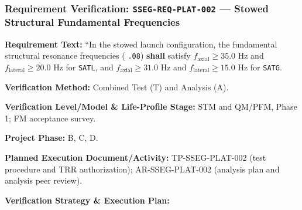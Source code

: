 \subsubsection{Requirement Verification: \texttt{SSEG-REQ-PLAT-002} --- Stowed Structural Fundamental Frequencies}
\label{ver:SSEG-REQ-PLAT-002}
\textbf{Requirement Text:} ``In the stowed launch configuration, the fundamental structural resonance frequencies ( \texttt{.08}) \textbf{shall} satisfy $f_{\text{axial}} \ge 35.0\text{ Hz}$ and $f_{\text{lateral}} \ge 20.0\text{ Hz}$ for \texttt{SATL}, and $f_{\text{axial}} \ge 31.0\text{ Hz}$ and $f_{\text{lateral}} \ge 15.0\text{ Hz}$ for \texttt{SATG}.
\par\textbf{Verification Method:} Combined Test (T) and Analysis (A).
\par\textbf{Verification Level/Model \& Life-Profile Stage:} STM and QM/PFM, Phase 1; FM acceptance survey.
\par\textbf{Project Phase:} B, C, D.
\par\textbf{Planned Execution Document/Activity:} TP-SSEG-PLAT-002 (test procedure and TRR authorization); AR-SSEG-PLAT-002 (analysis plan and analysis peer review).
\par\textbf{Verification Strategy \& Execution Plan:}

